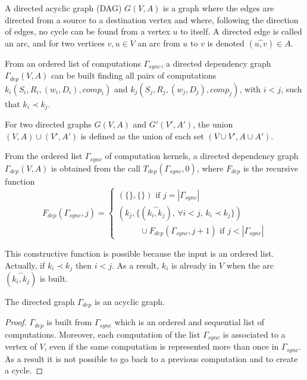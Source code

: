 \begin{mydef}
A directed acyclic graph (DAG) $G(V,A)$ is a graph where the edges are directed from a source to a destination vertex and where, following the direction of edges, no cycle can be found from a vertex $u$ to itself. A directed edge is called an arc, and for two vertices $v,u \in V$ an arc from $u$ to $v$ is denoted $(\overset{\frown}{u,v}) \in A$.
\end{mydef}

From an ordered list of computations $\Gamma_{sync}$, a directed dependency graph $\Gamma_{dep}(V,A)$ can be built finding all pairs of computations $k_i(S_i,R_i,(w_i,D_i),comp_i)$ and $k_j(S_j,R_j,(w_j,D_j),comp_j)$, with $i<j$, such that $k_i \prec k_j$. 

\begin{mydef}
For two directed graphs $G(V,A)$ and $G'(V',A')$, the union $(V,A)\cup (V',A')$ is defined as the union of each set $(V\cup V', A \cup A')$.
\end{mydef}

\begin{mydef}
From the ordered list $\Gamma_{sync}$ of computation kernels, a directed dependency graph $\Gamma_{dep}(V,A)$ is obtained from the call $T_{dep}(\Gamma_{sync},0)$, where $F_{dep}$ is the recursive function
\begin{equation*}
F_{dep}(\Gamma_{sync},j) = 
\begin{cases} 	(\{\},\{\}) \mbox{ if }j=|\Gamma_{sync}|\\
				(k_j, \{(\overset{\frown}{k_i,k_j})\mbox{, }\forall i < j \mbox{, } k_i\prec k_j \})\\
				\text{ } \qquad \cup F_{dep}(\Gamma_{sync},j+1) \mbox{ if }j<|\Gamma_{sync}|
\end{cases}
\end{equation*}
\end{mydef}

This constructive function is possible because the input is an ordered list. Actually, if $k_i\prec k_j$ then $i<j$. As a result, $k_i$ is already in $V$ when the arc $(\overset{\frown}{k_i,k_j})$ is built. 

\begin{myprop}
The directed graph $\Gamma_{dep}$ is an acyclic graph.
\end{myprop}

\begin{proof}
$\Gamma_{dep}$ is built from $\Gamma_{sync}$ which is an ordered and sequential list of computations. Moreover, each computation of the list $\Gamma_{sync}$ is associated to a vertex of $V$, even if the same computation is represented more than once in $\Gamma_{sync}$. As a result it is not possible to go back to a previous computation and to create a cycle.
\end{proof}

